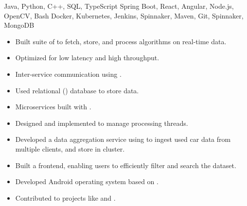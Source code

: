  Java, Python, C++, SQL, TypeScript\newline
{} Spring Boot, React, Angular, Node.js, OpenCV, Bash\newline
{} Docker, Kubernetes, Jenkins, Spinnaker, Maven, Git, Spinnaker, MongoDB\newline


\begin{itemize}
  \item Built  suite of  to fetch, store, and process algorithms on real-time  data.
  \item Optimized for low latency and high throughput.
  \item Inter-service communication using .
  \item Used relational () database to store data.
  \item Microservices built with .
  \item Designed and implemented  to manage processing threads.
 \end{itemize}

\begin{itemize}
    \item Developed a data aggregation service using  to ingest used car data from multiple clients, and store in  cluster.
    \item Built a  frontend, enabling users to efficiently filter and search the dataset.
 \end{itemize}
 
\begin{itemize}
  \item Developed Android operating system based on .
  \item Contributed to  projects like  and .
 \end{itemize}

